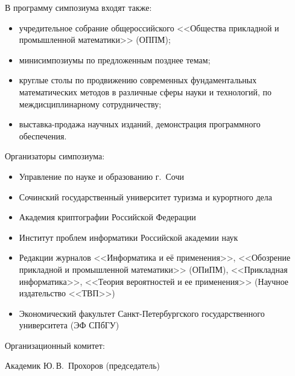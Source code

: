 \documentclass[10pt]{book}
\begin{document}
{\centering В программу симпозиума входят также:
\begin{itemize}
\item учредительное собрание общероссийского <<Общества прикладной и промышленной математики>> (ОППМ);\\[-13pt] 
\item минисимпозиумы по предложенным позднее темам; \\[-13pt]
\item круглые столы по продвижению современных фундаментальных математических методов в различные сферы науки и технологий, по междисциплинарному сотрудничеству; \\[-13pt]
\item выставка-продажа научных изданий, демонстрация программного обеспечения.
\end{itemize}

{\large Организаторы симпозиума: }
\begin{itemize}
\item Управление по науке и образованию г.~Сочи
\item Сочинский государственный университет туризма и курортного дела
\item Академия криптографии Российской Федерации
\item Институт проблем информатики Российской академии наук
\item Редакции журналов <<Информатика и её применения>>, <<Обозрение прикладной и промышленной математики>> (ОПиПМ), <<Прикладная информатика>>, <<Теория вероятностей и ее применения>> (Научное издательство <<ТВП>>) 
\item Экономический факультет Санкт-Петербургского государственного университета (ЭФ СПбГУ)
\end{itemize}

\bigskip

{\large Организационный комитет:}
\vspace*{6pt}

Академик Ю.\,В.~Прохоров (председатель)
\vspace*{6pt}

}
\end{document}
